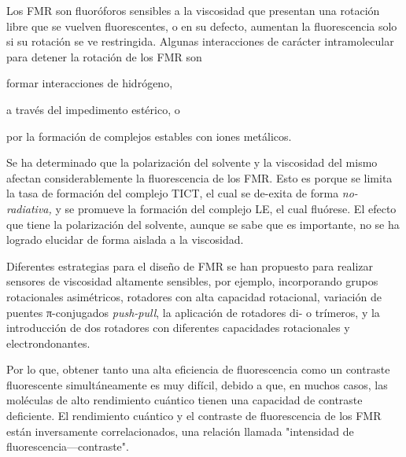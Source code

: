 \documentclass[spanish,mexico]{scrartcl}
\begin{document}
Los \gls{FMR} son fluoróforos sensibles a la viscosidad que presentan una rotación libre que se vuelven fluorescentes, o en su defecto, aumentan la fluorescencia solo si su rotación se ve restringida. Algunas interacciones de carácter intramolecular para detener la rotación de los \gls{FMR} son \begin{inparaenum}[i.]
    \item formar interacciones de hidrógeno,\autocite{wuMultistageRotationalSpeed2018}
    \item a través del impedimento estérico,\autocite{faulknerAllostericRegulationRotational2016} o
    \item por la formación de complejos estables con iones metálicos.\autocite{yadavViscochromicMechanochromicUnsymmetrical2019}
\end{inparaenum}

Se ha determinado que la polarización del solvente y la viscosidad del mismo afectan considerablemente la fluorescencia de los \gls{FMR}. Esto es porque se limita la tasa de formación del complejo \gls{TICT}, el cual se de-exita de forma \emph{no-radiativa,} y se promueve la formación del complejo \gls{LE}, el cual fluórese. El efecto que tiene la polarización del solvente, aunque se sabe que es importante, no se ha logrado elucidar de forma aislada a la viscosidad.\cite{haidekkerEffectsSolventPolarity2005}

Diferentes estrategias para el diseño de \gls{FMR} se han propuesto para realizar sensores de viscosidad altamente sensibles, por ejemplo, incorporando grupos rotacionales asimétricos,\autocite{leePyrrolicMolecularRotors2016} rotadores con alta capacidad rotacional,\autocite{karpenkoPushPullDioxaborine2016} variación de puentes π-conjugados \emph{push-pull},\autocite{karpenkoPushPullDioxaborine2016} la aplicación de rotadores di- o trímeros,\autocite{kimballBODIPYBODIPYDyad2015} y la introducción de dos rotadores con diferentes capacidades rotacionales y electrondonantes.\autocite{rautTriazinebasedBODIPYTrimer2016}

Por lo que, obtener tanto una alta eficiencia de fluorescencia como un contraste fluorescente simultáneamente es muy difícil, debido a que, en muchos casos, las moléculas de alto rendimiento cuántico tienen una capacidad de contraste deficiente. 
El rendimiento cuántico y el contraste de fluorescencia de los \gls{FMR} están inversamente correlacionados, una relación llamada "intensidad de fluorescencia---contraste".\autocite{leeFrontCoverFluorescent2018}
\end{document}
